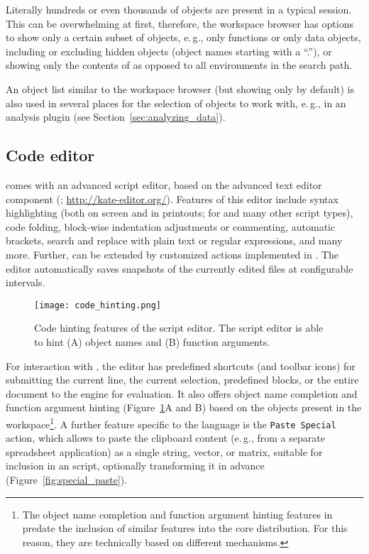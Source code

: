 Literally hundreds or even thousands of objects are present in a typical
 session. This can be overwhelming at
first, therefore, the workspace browser has options to show only a certain
subset of objects, e.\,g., only functions or only data objects, including
or excluding hidden objects (object names starting with a 
``.''), or showing only the contents of  as
opposed to all environments in the search path.

An object list similar to the workspace browser (but showing only 
 by default) is also used in several places for the
selection of objects to work with, e.\,g., in an analysis plugin (see Section~\ref{sec:analyzing_data}).


\subsection{Code editor}
\label{sec:code_editor}

 comes with an advanced
 script editor, based on the
 advanced text editor component (; \url{http://kate-editor.org/}). Features of this
editor include syntax highlighting (both on screen and in printouts; for
 and many other script types), code
folding, block-wise indentation adjustments or commenting, automatic
brackets, search and replace with plain text or regular expressions,
and many more. Further,  can be extended by 
customized actions implemented in  \citep{KateScriptedActions}.
The editor automatically saves snapshots of the
currently edited files at configurable intervals. 

\begin{figure}[t!]
 \centering
 \texttt{[image: code\_hinting.png]}
 \caption{Code hinting features of the script editor. The script editor is able to hint (A)  object names
and (B) function arguments.}
 \label{fig:code_hinting}
\end{figure}

\medskip
For interaction with , the editor has
predefined shortcuts (and toolbar icons) for submitting the current line, the current 
selection, predefined blocks, or the entire document to the
 engine for evaluation. It also 
offers object name completion and function argument hinting 
(Figure~\ref{fig:code_hinting}A and B) based on the objects present in
the  workspace\footnote{The object name
completion and function argument hinting features in  predate the
inclusion of similar features into the core
 distribution. For this reason, they are
technically based on different mechanisms.}. A further feature specific
to the  language is the
\texttt{Paste Special} action, which allows to
paste the clipboard content (e.\,g., from a separate spreadsheet
application) as a single string, vector, or matrix, suitable
for inclusion in an  script, optionally
transforming it in advance (Figure~\ref{fig:special_paste}).

